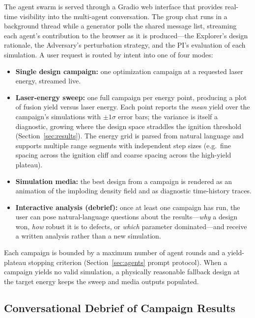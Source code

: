 \documentclass[conference]{IEEEtran}
\begin{document}
The agent swarm is served through a Gradio web interface that provides real-time visibility into the multi-agent conversation.  The group chat runs in a background thread while a generator polls the shared message list, streaming each agent's contribution to the browser as it is produced---the Explorer's design rationale, the Adversary's perturbation strategy, and the PI's evaluation of each simulation.  A user request is routed by intent into one of four modes:

\begin{itemize}
    \item \textbf{Single design campaign:} one optimization campaign at a requested laser energy, streamed live.
    \item \textbf{Laser-energy sweep:} one full campaign per energy point, producing a plot of fusion yield versus laser energy.  Each point reports the \emph{mean} yield over the campaign's simulations with $\pm 1\sigma$ error bars; the variance is itself a diagnostic, growing where the design space straddles the ignition threshold (Section~\ref{sec:results}).  The energy grid is parsed from natural language and supports multiple range segments with independent step sizes (e.g.\ fine spacing across the ignition cliff and coarse spacing across the high-yield plateau).
    \item \textbf{Simulation media:} the best design from a campaign is rendered as an animation of the imploding density field and as diagnostic time-history traces.
    \item \textbf{Interactive analysis (debrief):} once at least one campaign has run, the user can pose natural-language questions about the results---\textit{why} a design won, \textit{how} robust it is to defects, or \textit{which} parameter dominated---and receive a written analysis rather than a new simulation.
\end{itemize}

Each campaign is bounded by a maximum number of agent rounds and a yield-plateau stopping criterion (Section~\ref{sec:agents} prompt protocol).  When a campaign yields no valid simulation, a physically reasonable fallback design at the target energy keeps the sweep and media outputs populated.

\subsection{Conversational Debrief of Campaign Results}
\end{document}
